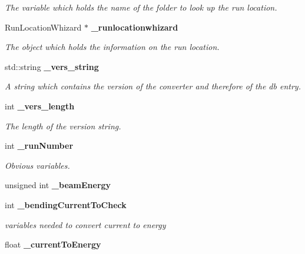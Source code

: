 \begin{DoxyCompactItemize}
\begin{DoxyCompactList}\small\item\em The variable which holds the name of the folder to look up the run location. \end{DoxyCompactList}\item 
Run\-Location\-Whizard $\ast$ {\bf \-\_\-runlocationwhizard}\label{classmarlin_1_1RunInfoProcessor_a04731b4d9bb5e6635449ae5e997ea54e}

\begin{DoxyCompactList}\small\item\em The object which holds the information on the run location. \end{DoxyCompactList}\item 
std\-::string {\bf \-\_\-vers\-\_\-string}\label{classmarlin_1_1RunInfoProcessor_a281b035be172c5f29b4406256e6ff660}

\begin{DoxyCompactList}\small\item\em A string which contains the version of the converter and therefore of the db entry. \end{DoxyCompactList}\item 
int {\bf \-\_\-vers\-\_\-length}\label{classmarlin_1_1RunInfoProcessor_ab39f8a9b1988e14a2aeb1879d2ff2eab}

\begin{DoxyCompactList}\small\item\em The length of the version string. \end{DoxyCompactList}\item 
int {\bf \-\_\-run\-Number}\label{classmarlin_1_1RunInfoProcessor_ac765ef550fc7ae185901ab1766afd0f8}

\begin{DoxyCompactList}\small\item\em Obvious variables. \end{DoxyCompactList}\item 
unsigned int {\bfseries \-\_\-beam\-Energy}\label{classmarlin_1_1RunInfoProcessor_a06b6da5104e1817215b1588452dd1dd8}

\item 
int {\bf \-\_\-bending\-Current\-To\-Check}\label{classmarlin_1_1RunInfoProcessor_ad17af4643c8798dab2642df821a87952}

\begin{DoxyCompactList}\small\item\em variables needed to convert current to energy \end{DoxyCompactList}\item 
float {\bfseries \-\_\-current\-To\-Energy}\label{classmarlin_1_1RunInfoProcessor_aec2e8768e37e8807479bec91314b7742}


\end{DoxyCompactItemize}
